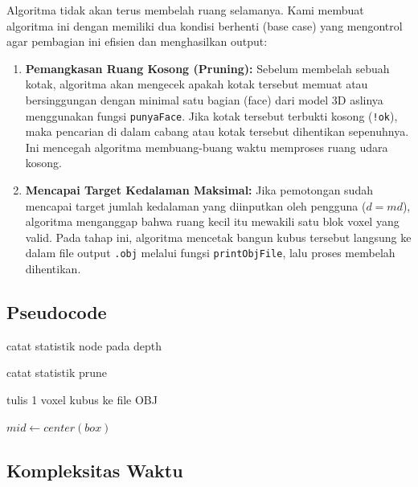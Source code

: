 \documentclass{article}
\begin{document}
Algoritma tidak akan terus membelah ruang selamanya. Kami membuat algoritma ini dengan memiliki dua kondisi berhenti (base case) 
yang mengontrol agar pembagian ini efisien dan menghasilkan output:

\begin{enumerate}
    \item \textbf{Pemangkasan Ruang Kosong (Pruning):} Sebelum membelah sebuah kotak, algoritma akan 
    mengecek apakah kotak tersebut memuat atau bersinggungan dengan minimal satu bagian (face) dari 
    model 3D aslinya menggunakan fungsi \texttt{punyaFace}. Jika kotak tersebut terbukti kosong (\texttt{!ok}), 
    maka pencarian di dalam cabang atau kotak tersebut dihentikan sepenuhnya. Ini mencegah algoritma 
    membuang-buang waktu memproses ruang udara kosong.
    
    \item \textbf{Mencapai Target Kedalaman Maksimal:} Jika pemotongan sudah mencapai target jumlah 
    kedalaman yang diinputkan oleh pengguna (\(d = md\)), algoritma menganggap bahwa ruang kecil itu 
    mewakili satu blok voxel yang valid. Pada tahap ini, algoritma mencetak bangun kubus tersebut 
    langsung ke dalam file output \texttt{.obj} melalui fungsi \texttt{printObjFile}, lalu proses 
    membelah dihentikan.
\end{enumerate}

\subsection{Pseudocode}

\begin{algorithm}
\caption{buildOctree}
\begin{algorithmic}[1]
    \State catat statistik node pada depth

        \State catat statistik prune
        \State \Return
    \EndIf

        \State tulis 1 voxel kubus ke file OBJ
        \State \Return
    \EndIf

    \State $mid \gets center(box)$

        \State {}
    \EndFor
\EndProcedure
\end{algorithmic}
\end{algorithm}

\subsection{Kompleksitas Waktu}
\end{document}
